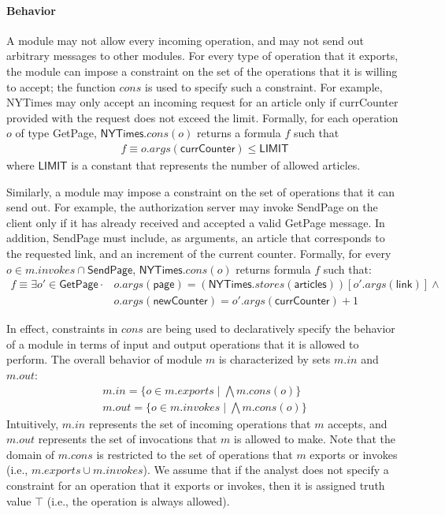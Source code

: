 \paragraph{\textbf{Behavior}} A module may not allow every incoming
operation, and may not send out arbitrary messages to other
modules. For every type of operation that it exports, the module can
impose a constraint on the set of the operations that it is willing to
accept; the function $cons$ is used to specify such a constraint. For
example, \textsf{NYTimes} may only accept an incoming request for an
article only if \textsf{currCounter} provided with the request does
not exceed the limit. Formally, for each operation $o$ of type
\textsf{GetPage}, $\textsf{NYTimes}.cons(o)$ returns a formula $f$
such that
\begin{align*}
f \equiv o.args(\textsf{currCounter}) \leq \textsf{LIMIT}
\end{align*}
where $\textsf{LIMIT}$ is a constant that represents the number of
allowed articles.

Similarly, a module may impose a constraint on the set of operations
that it can send out. For example, the authorization server may invoke
\textsf{SendPage} on the client only if it has already received and
accepted a valid \textsf{GetPage} message. In addition,
\textsf{SendPage} must include, as arguments, an article that
corresponds to the requested link, and an increment of the current
counter. Formally, for every $o \in m.invokes \cap \textsf{SendPage}$,
$\textsf{NYTimes}.cons(o)$ returns formula $f$ such that:
\begin{align*}
f \equiv \exists o' \in \textsf{GetPage} \cdot & o.args(\textsf{page}) =
(\textsf{NYTimes}.stores(\textsf{articles}))[o'.args(\textsf{link})]
\land \\
& o.args(\textsf{newCounter}) = o'.args(\textsf{currCounter}) + 1
\end{align*}

In effect, constraints in $cons$ are being used to
declaratively specify the behavior of a module in terms of input and
output operations that it is allowed to perform. The overall behavior
of module $m$ is characterized by sets $m.in$ and $m.out$:
\begin{align*}
m.in = \{ o \in m.exports \;|\; \bigwedge m.cons(o) \} \\
m.out = \{ o \in m.invokes \;|\; \bigwedge m.cons(o) \}
\end{align*}
Intuitively, $m.in$ represents the set of incoming operations that $m$
accepts, and $m.out$ represents the set of invocations that $m$ is
allowed to make. Note that the domain of $m.cons$ is restricted to
the set of operations that $m$ exports or invokes (i.e., $m.exports
\cup m.invokes$). We assume that if the analyst does not specify a
constraint for an operation that it exports or invokes,
then it is assigned truth value $\top$ (i.e., the operation is always
allowed).


